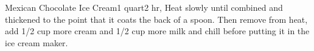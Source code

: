 \begin{recipe}{Mexican Chocolate Ice Cream}{1 quart}{2 hr, }
\freeform 
{}
Heat slowly until combined and thickened to the point that it coats the back of a spoon. Then remove from heat, add 1/2 cup more cream and 1/2 cup more milk and chill before putting it in the ice cream maker.
\end{recipe}
